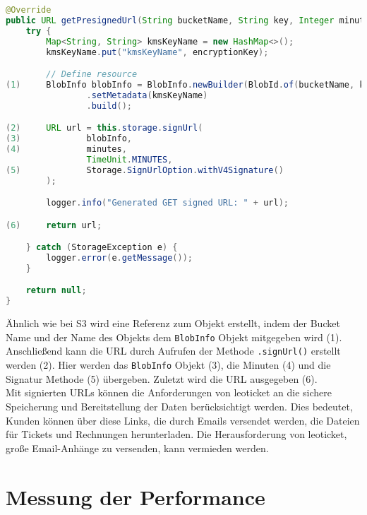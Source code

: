 \begin{lstlisting}[language=Java, caption=Prototyp Code Snippet - Generierung einer signierten URL durch GC]
@Override
public URL getPresignedUrl(String bucketName, String key, Integer minutes, String encryptionKey) {
    try {
        Map<String, String> kmsKeyName = new HashMap<>();
        kmsKeyName.put("kmsKeyName", encryptionKey);

        // Define resource
(1)     BlobInfo blobInfo = BlobInfo.newBuilder(BlobId.of(bucketName, key))
                .setMetadata(kmsKeyName)
                .build();

(2)     URL url = this.storage.signUrl(
(3)             blobInfo,
(4)             minutes,
                TimeUnit.MINUTES,
(5)             Storage.SignUrlOption.withV4Signature()
        );

        logger.info("Generated GET signed URL: " + url);

(6)     return url;

    } catch (StorageException e) {
        logger.error(e.getMessage());
    }

    return null;
}
\end{lstlisting}

Ähnlich wie bei S3 wird eine Referenz zum Objekt erstellt, indem der Bucket Name und der Name des Objekts dem \verb|BlobInfo| Objekt mitgegeben wird (1). Anschließend kann die URL durch Aufrufen der Methode \verb|.signUrl()| erstellt werden (2). Hier werden das \verb|BlobInfo| Objekt (3), die Minuten (4) und die Signatur Methode (5) übergeben. Zuletzt wird die URL ausgegeben (6).\\

Mit signierten URLs können die Anforderungen von leoticket an die sichere Speicherung und Bereitstellung der Daten berücksichtigt werden. Dies bedeutet, Kunden können über diese Links, die durch Emails versendet werden, die Dateien für Tickets und Rechnungen herunterladen. Die Herausforderung von leoticket, große Email-Anhänge zu versenden, kann vermieden werden.\\

\newpage

\section{Messung der Performance}

